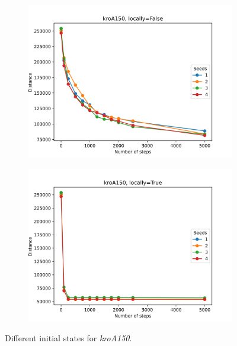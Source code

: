 \begin{figure}[!htb]
	\centering
	\begin{subfigure}{0.45\textwidth}
		\includegraphics[width=\textwidth]{img/kroA150_seeds_locally=False}
	\end{subfigure}
	\begin{subfigure}{0.45\textwidth}
		\includegraphics[width=\textwidth]{img/kroA150_seeds_locally=True}
	\end{subfigure}
	\caption{Different initial states for \textit{kroA150}.}
	\label{fig:kroA150_seeds}
\end{figure}